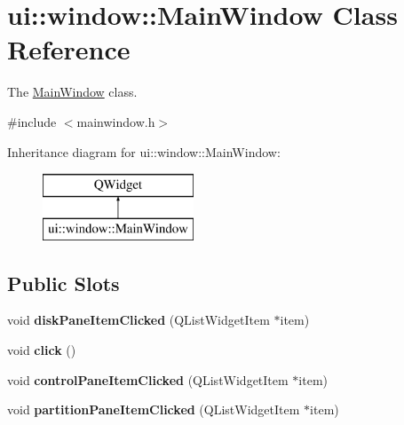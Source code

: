 \hypertarget{classui_1_1window_1_1_main_window}{}\section{ui\+:\+:window\+:\+:Main\+Window Class Reference}
\label{classui_1_1window_1_1_main_window}


The \mbox{\hyperlink{classui_1_1window_1_1_main_window}{Main\+Window}} class.  




{\ttfamily \#include $<$mainwindow.\+h$>$}

Inheritance diagram for ui\+:\+:window\+:\+:Main\+Window\+:\begin{figure}[H]
\begin{center}
\leavevmode
\includegraphics[height=2.000000cm]{classui_1_1window_1_1_main_window}
\end{center}
\end{figure}
\subsection*{Public Slots}
\begin{DoxyCompactItemize}
\item 
\mbox{\label{classui_1_1window_1_1_main_window_a59fc90a3e94d7b3749a01420154b7180}} 
void {\bfseries disk\+Pane\+Item\+Clicked} (Q\+List\+Widget\+Item $\ast$item)
\item 
\mbox{\label{classui_1_1window_1_1_main_window_a1c0253c5f8350142145e647ba11b4eb5}} 
void {\bfseries click} ()
\item 
\mbox{\label{classui_1_1window_1_1_main_window_a3c3e137427fb9ef9f774f08d40b98d7b}} 
void {\bfseries control\+Pane\+Item\+Clicked} (Q\+List\+Widget\+Item $\ast$item)
\item 
\mbox{\label{classui_1_1window_1_1_main_window_a6b7db1a39889962fc97e0f8a0840ab4c}} 
void {\bfseries partition\+Pane\+Item\+Clicked} (Q\+List\+Widget\+Item $\ast$item)
\end{DoxyCompactItemize}
